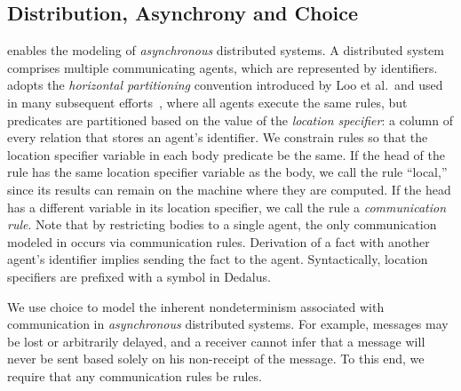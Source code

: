 \subsection{Distribution, Asynchrony and Choice}
\lang enables the modeling of {\em asynchronous} distributed systems.  A distributed system comprises multiple communicating agents, which are represented by identifiers.  \lang adopts the {\em horizontal partitioning} convention introduced by Loo et al.\ and used in many subsequent efforts~\cite{Loo:2005}, where all agents execute the same rules, but predicates are partitioned based on the value of the {\em location specifier}: a column of every relation that stores an agent's identifier.  We constrain \lang rules so that the location specifier variable in each body predicate be the same.  If the head of the rule has the same location specifier variable as the body, we call the rule ``local,'' since its results can remain on the machine where they are computed.  If the head has a different variable in its location specifier, we call the rule a {\em communication rule}.  Note that by restricting bodies to a single agent, the only communication modeled in \lang occurs via communication rules.  Derivation of a fact with another agent's identifier implies sending the fact to the agent.  Syntactically, location specifiers are prefixed with a \dedalus{\#} symbol in Dedalus.

We use choice to model the inherent nondeterminism associated with communication in {\em asynchronous} distributed systems.  For example, messages may be lost or arbitrarily delayed, and a receiver cannot infer that a message will never be sent based solely on his non-receipt of the message.  To this end, we require that any communication rules be  rules.


% 
% 



